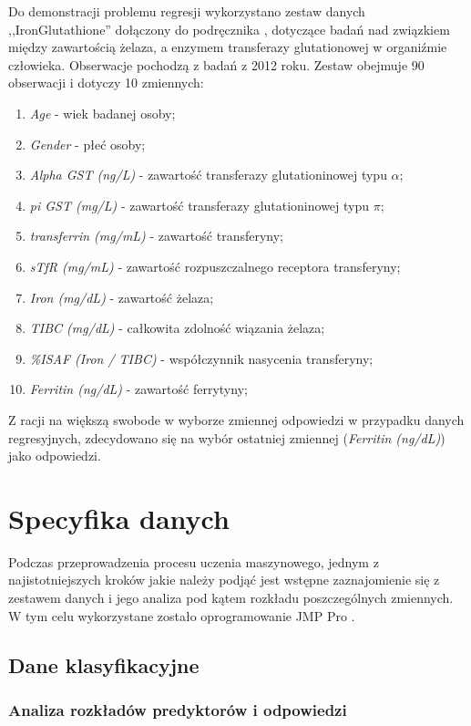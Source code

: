 	Do demonstracji problemu regresji wykorzystano zestaw danych ,,IronGlutathione'' dołączony do podręcznika \cite{biostatisticsJMP}, dotyczące badań nad związkiem między zawartością żelaza, a enzymem transferazy glutationowej w organiźmie człowieka. Obserwacje pochodzą z badań z 2012 roku. Zestaw obejmuje 90 obserwacji i dotyczy 10 zmiennych:
	
	\begin{enumerate}
		\item \textit{Age} - wiek badanej osoby;
		\item \textit{Gender} - płeć osoby;
		\item \textit{Alpha GST (ng/L)} - zawartość transferazy glutationinowej typu $\alpha$;
		\item \textit{pi GST (mg/L)} - zawartość transferazy glutationinowej typu $\pi$;
		\item \textit{transferrin (mg/mL)} - zawartość transferyny;
		\item \textit{sTfR (mg/mL)} - zawartość rozpuszczalnego receptora transferyny;
		\item \textit{Iron (mg/dL)} - zawartość żelaza;
		\item \textit{TIBC (mg/dL)} - całkowita zdolność wiązania żelaza;
		\item \textit{\%ISAF (Iron / TIBC)} - współczynnik nasycenia transferyny;
		\item \textit{Ferritin (ng/dL)} - zawartość ferrytyny;
	\end{enumerate} 
	
	Z racji na większą swobode w wyborze zmiennej odpowiedzi w przypadku danych regresyjnych, zdecydowano się na wybór ostatniej zmiennej (\textit{Ferritin (ng/dL)}) jako odpowiedzi. 
	
\section{Specyfika danych}

	Podczas przeprowadzenia procesu uczenia maszynowego, jednym z najistotniejszych kroków jakie należy podjąć jest wstępne zaznajomienie się z zestawem danych i jego analiza pod kątem rozkładu poszczególnych zmiennych. W tym celu wykorzystane zostało oprogramowanie JMP Pro \cite{jmp}. 

	\subsection{Dane klasyfikacyjne}
	\subsubsection{Analiza rozkładów predyktorów i odpowiedzi}
		

